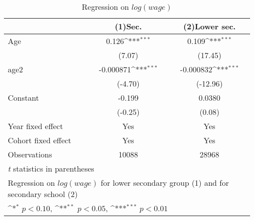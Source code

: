 \begin{table}[htbp]\centering
\def\sym#1{\ifmmode^{#1}\else\(^{#1}\)\fi}
\caption{Regression on \(log(wage)\)\label{Tab:reg1}}
\begin{tabular}{l*{2}{c}}
\toprule
                    &\multicolumn{1}{c}{(1)Sec.\label{reg1_w_heduc}}         &\multicolumn{1}{c}{(2)Lower sec.\label{reg1_w_leduc}}         \\
\midrule
Age                 &       0.126\sym{***}&       0.109\sym{***}\\
                    &      (7.07)         &     (17.45)         \\
\addlinespace
age2                &   -0.000871\sym{***}&   -0.000832\sym{***}\\
                    &     (-4.70)         &    (-12.96)         \\
\addlinespace
Constant            &      -0.199         &      0.0380         \\
                    &     (-0.25)         &      (0.08)         \\
\addlinespace
Year fixed effect & Yes             &       Yes\\
\addlinespace
Cohort fixed effect& Yes    &           Yes\\
\midrule
Observations        &       10088         &       28968         \\
\bottomrule
\multicolumn{3}{l}{\footnotesize \textit{t} statistics in parentheses}\\
\multicolumn{3}{l}{\footnotesize Regression on \(log(wage)\) for lower secondary group (1) and for secondary school (2)}\\
\multicolumn{3}{l}{\footnotesize \sym{*} \(p<0.10\), \sym{**} \(p<0.05\), \sym{***} \(p<0.01\)}\\
\end{tabular}
\end{table}
